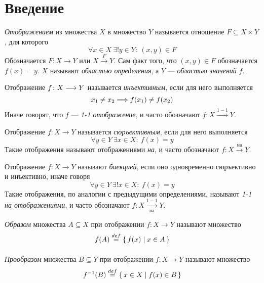 \section{Введение}

\begin{definition}
    \textit{Отображением} из множества $X$ в множество $Y$ называется
    отношение $F \subseteq X \times Y$, для которого
\[
    \forall x \in X~\exists! y \in Y \colon ~(x, y) \in F
\]
Обозначается $F \colon X \to Y$ или $X \xrightarrow{F} Y$. Сам факт того, что $(x, y) \in F$ обозначается $f(x) = y$. $X$ называют \textit{областью определения}, а $Y$ --- \textit{областью значений} $f$.
\end{definition}

\begin{definition}
    Отображение $f \colon X \longrightarrow Y$ называется \textit{инъективным}, если для него выполняется
\[
    x_1 \neq x_2 \Longrightarrow f(x_1) \neq f(x_2)
\]
Иначе говорят, что $f$ --- \textit{1-1 отображение}, и часто обозначают
$f \colon X \xrightarrow{1-1} Y$.
\end{definition}

\begin{definition}
    Отображение $f \colon X \to Y$ называется \textit{сюръективным}, если для него выполняется
\[
    \forall y \in Y~ \exists x \in X \colon~ f(x) = y
\]
Такие отображения называют отображениями \textit{на}, и часто обозначают
$f \colon X \xrightarrow{\text{на}} Y$.

\end{definition}

\begin{definition}
    Отображение $f \colon X \to Y$ называют \textit{биекцией}, если оно одновременно сюръективно и инъективно, иначе говоря
\[
    \forall y \in Y~ \exists! x \in X \colon~ f(x) = y
\]
Такие отображения, по аналогии с предыдущими определениями,
называют \textit{1-1 на отображениями}, и часто обозначают
$f \colon X \xrightarrow[\text{на}]{1-1} Y$.
\end{definition}

\begin{definition}
    \textit{Образом} множества $A \subseteq X$ при отображении $f \colon X \to Y$
    называют множество
\[
    f(A) \overset{def}{\underset{}{=}} \{\, f(x) \mid x \in A \,\}
\]
\end{definition}

\begin{definition}
    \textit{Прообразом} множества $B \subseteq Y$ при отображении
    $f \colon X \to Y$ называют множество
\[
    f^{-1}(B) \overset{def}{\underset{}{=}} \{\, x \in X \mid f(x) \in B \,\}
\]
\end{definition}

